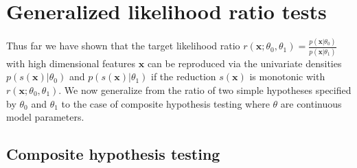 \documentclass[12pt]{article}
\numberwithin{equation}{section}
\theoremstyle{plain}
\begin{document}


\section{Generalized likelihood ratio tests}
\label{sec:generalized-likelihood-ratio}

Thus far we have shown that the target likelihood ratio
$r(\mathbf{x};\theta_0,\theta_1)=\frac{p(\mathbf{x}|\theta_0)}{p(\mathbf{x}|\theta_1)}$
with high dimensional features $\mathbf{x}$ can be reproduced via the univariate
densities $p(s(\mathbf{x})|\theta_0)$ and $p(s(\mathbf{x})|\theta_1)$ if the
reduction $s(\mathbf{x})$ is monotonic with $r(\mathbf{x};\theta_0,\theta_1)$.
We now generalize from the ratio of two simple hypotheses specified by
$\theta_0$ and $\theta_1$ to the case of composite hypothesis testing where
$\theta$ are continuous model parameters.

\subsection{Composite hypothesis testing}



%
%
%
%
\end{document}

